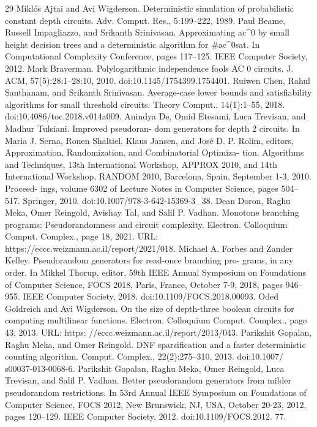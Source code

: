 \documentclass[10pt,a4paper]{article}
\begin{document}
\begin{thebibliography}{29}
 Miklós Ajtai and Avi Wigderson. Deterministic simulation of probabilistic constant depth circuits. Adv. Comput. Res., 5:199–222, 1989.
 Paul Beame, Russell Impagliazzo, and Srikanth Srinivasan. Approximating ac\textasciicircum{}0 by small height decision trees and a deterministic algorithm for \#ac\textasciicircum{}0sat. In Computational Complexity Conference, pages 117–125. IEEE Computer Society, 2012.
 Mark Braverman. Polylogarithmic independence fools AC 0 circuits. J. ACM, 57(5):28:1–28:10, 2010. doi:10.1145/1754399.1754401.
 Ruiwen Chen, Rahul Santhanam, and Srikanth Srinivasan. Average-case lower bounds and satisfiability algorithms for small threshold circuits. Theory Comput., 14(1):1–55, 2018. doi:10.4086/toc.2018.v014a009.
 Anindya De, Omid Etesami, Luca Trevisan, and Madhur Tulsiani. Improved pseudoran- dom generators for depth 2 circuits. In Maria J. Serna, Ronen Shaltiel, Klaus Jansen, and José D. P. Rolim, editors, Approximation, Randomization, and Combinatorial Optimiza- tion. Algorithms and Techniques, 13th International Workshop, APPROX 2010, and 14th International Workshop, RANDOM 2010, Barcelona, Spain, September 1-3, 2010. Proceed- ings, volume 6302 of Lecture Notes in Computer Science, pages 504–517. Springer, 2010. doi:10.1007/978-3-642-15369-3\_38.
 Dean Doron, Raghu Meka, Omer Reingold, Avishay Tal, and Salil P. Vadhan. Monotone branching programs: Pseudorandomness and circuit complexity. Electron. Colloquium Comput. Complex., page 18, 2021. URL: https://eccc.weizmann.ac.il/report/2021/018.
 Michael A. Forbes and Zander Kelley. Pseudorandom generators for read-once branching pro- grams, in any order. In Mikkel Thorup, editor, 59th IEEE Annual Symposium on Foundations of Computer Science, FOCS 2018, Paris, France, October 7-9, 2018, pages 946–955. IEEE Computer Society, 2018. doi:10.1109/FOCS.2018.00093.
 Oded Goldreich and Avi Wigderson. On the size of depth-three boolean circuits for computing multilinear functions. Electron. Colloquium Comput. Complex., page 43, 2013. URL: https: //eccc.weizmann.ac.il/report/2013/043.
 Parikshit Gopalan, Raghu Meka, and Omer Reingold. DNF sparsification and a faster deterministic counting algorithm. Comput. Complex., 22(2):275–310, 2013. doi:10.1007/ s00037-013-0068-6.
 Parikshit Gopalan, Raghu Meka, Omer Reingold, Luca Trevisan, and Salil P. Vadhan. Better pseudorandom generators from milder pseudorandom restrictions. In 53rd Annual IEEE Symposium on Foundations of Computer Science, FOCS 2012, New Brunswick, NJ, USA, October 20-23, 2012, pages 120–129. IEEE Computer Society, 2012. doi:10.1109/FOCS.2012. 77.

\end{thebibliography}
\end{document}
